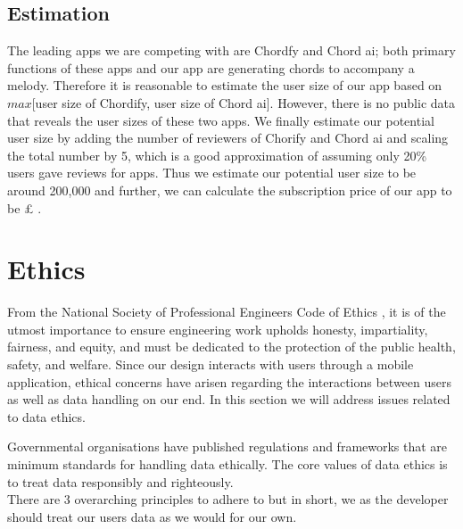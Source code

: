 \subsection{Estimation}
The leading apps we are competing with are Chordfy and Chord ai; both primary functions of these apps and our app are generating chords to accompany a melody.  Therefore it is reasonable to estimate the user size of our app based on $max$[user size of Chordify, user size of Chord ai]. However, there is no public data that reveals the user sizes of these two apps. We finally estimate our potential user size by adding the number of reviewers of Chorify and Chord ai and scaling the total number by 5, which is a good approximation of assuming only 20\% users gave reviews for apps. Thus we estimate our potential user size to be around 200,000 and further, we can calculate the subscription price of our app to be £ .

\section{Ethics}
From the National Society of Professional Engineers Code of Ethics , it is of the utmost 
importance to ensure engineering work upholds honesty, impartiality, fairness, and equity, and must be dedicated to 
the protection of the public health, safety, and welfare. Since our design interacts with users
through a mobile application, ethical concerns have arisen regarding the interactions between users 
as well as data handling on our end. In this section we will address issues related to data ethics.

Governmental organisations have published regulations  and frameworks
 that are minimum standards for handling data ethically. The core values of data ethics 
is to treat data responsibly and righteously.
\\
There are 3 overarching principles to adhere to but in short, we as the developer should treat our 
users\textsc{} data as we would for our own.

